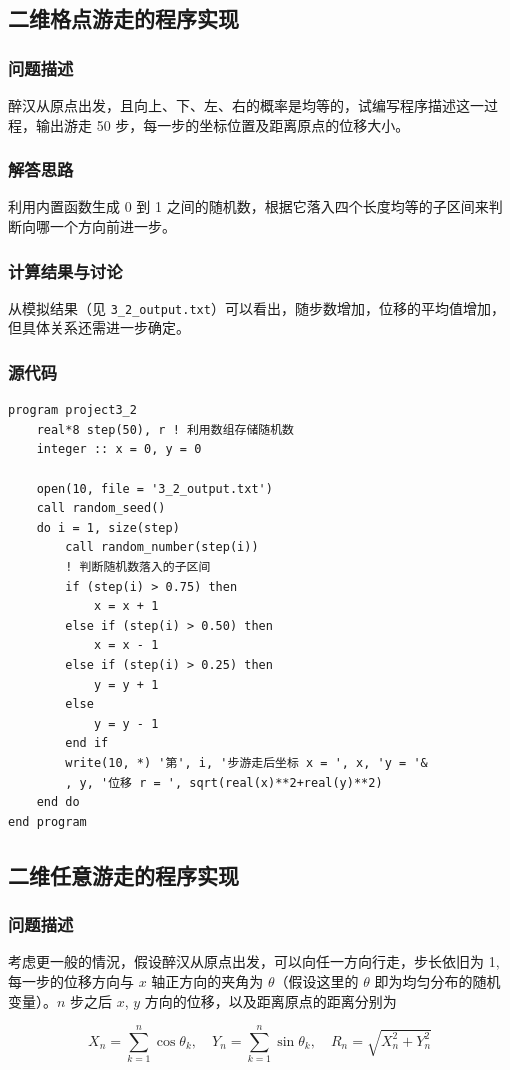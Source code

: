 \documentclass{ctexart}
\begin{document}
\subsection{二维格点游走的程序实现}
\subsubsection{问题描述}
醉汉从原点出发，且向上、下、左、右的概率是均等的，试编写程序描述这一过程，输出游走 50 步，每一步的坐标位置及距离原点的位移大小。
\subsubsection{解答思路}
利用内置函数生成 0 到 1 之间的随机数，根据它落入四个长度均等的子区间来判断向哪一个方向前进一步。
\subsubsection{计算结果与讨论}
从模拟结果（见 \verb|3_2_output.txt|）可以看出，随步数增加，位移的平均值增加，但具体关系还需进一步确定。
\subsubsection{源代码}
\begin{lstlisting}
program project3_2
	real*8 step(50), r ! 利用数组存储随机数
	integer :: x = 0, y = 0

	open(10, file = '3_2_output.txt')
	call random_seed()
	do i = 1, size(step)
		call random_number(step(i))
		! 判断随机数落入的子区间
		if (step(i) > 0.75) then
			x = x + 1
		else if (step(i) > 0.50) then
			x = x - 1
		else if (step(i) > 0.25) then
			y = y + 1
		else
			y = y - 1
		end if
		write(10, *) '第', i, '步游走后坐标 x = ', x, 'y = '&
		, y, '位移 r = ', sqrt(real(x)**2+real(y)**2)
	end do
end program
\end{lstlisting}
\subsection{二维任意游走的程序实现}
\subsubsection{问题描述}
考虑更一般的情況，假设醉汉从原点出发，可以向任一方向行走，步长依旧为 1, 每一步的位移方向与 $x$ 轴正方向的夹角为 $\theta$（假设这里的 $\theta$ 即为均匀分布的随机变量）。$n$ 步之后 $x$, $y$ 方向的位移，以及距离原点的距离分别为

$$
X_{n}=\sum_{k=1}^{n} \cos \theta_{k}, \quad Y_{n}=\sum_{k=1}^{n} \sin \theta_{k}, \quad R_{n}=\sqrt{X_{n}^{2}+Y_{n}^{2}}
$$
\end{document}
